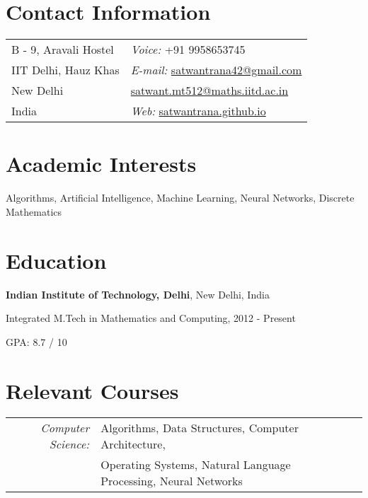 \documentclass[margin,line]{res}
\newenvironment{list1}{
  \begin{list}{\ding{113}}{%
      \setlength{\itemsep}{0in}
      \setlength{\parsep}{0in} \setlength{\parskip}{0in}
      \setlength{\topsep}{0in} \setlength{\partopsep}{0in} 
      \setlength{\leftmargin}{0.17in}}}{\end{list}}
\begin{document}

\begin{resume}
\section{\sc Contact Information}
\vspace{.05in}
\begin{tabular}{@{}p{2in}p{8in}}
B - 9, Aravali Hostel             & {\it Voice:}  +91 9958653745 \\            
IIT Delhi, Hauz Khas  & {\it E-mail:}  \href{mailto:satwantrana42@gmail.com}{satwantrana42@gmail.com} \\         
New Delhi &  \hspace{11.6 mm} \href{mailto:satwant.mt512@maths.iitd.ac.in}{satwant.mt512@maths.iitd.ac.in}\\   
India  & {\it Web:}  \href{http://satwantrana.github.io}{satwantrana.github.io}\\   
\end{tabular}


\section{\sc Academic Interests}
Algorithms, Artificial Intelligence, Machine Learning, Neural Networks, Discrete Mathematics

\section{\sc Education}
{\bf Indian Institute of Technology, Delhi}, New Delhi, India\\
\vspace*{-.1in}
\begin{list1}
\item[] Integrated M.Tech in Mathematics and Computing,  2012 - Present
\item[] GPA: 8.7 / 10
\end{list1}

\section{\sc Relevant Courses}

\begin{tabular}{rlp{5cm}}

\em{Computer Science:} & Algorithms, Data Structures, Computer Architecture,
\\ & Operating Systems, Natural Language Processing, Neural Networks  \\


\end{tabular}
\end{resume}
\end{document}
